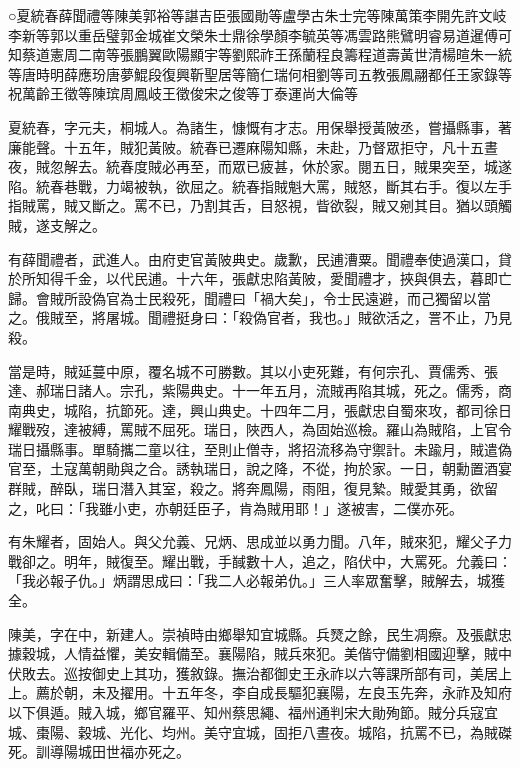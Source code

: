 
\begin{pinyinscope}
○夏統春薛聞禮等陳美郭裕等諶吉臣張國勛等盧學古朱士完等陳萬策李開先許文岐李新等郭以重岳璧郭金城崔文榮朱士鼎徐學顏李毓英等馮雲路熊鷿明睿易道暹傅可知蔡道憲周二南等張鵬翼歐陽顯宇等劉熙祚王孫蘭程良籌程道壽黃世清楊暄朱一統等唐時明薛應玢唐夢鯤段復興靳聖居等簡仁瑞何相劉等司五教張鳳翮都任王家錄等祝萬齡王徵等陳瑸周鳳岐王徵俊宋之俊等丁泰運尚大倫等

夏統春，字元夫，桐城人。為諸生，慷慨有才志。用保舉授黃陂丞，嘗攝縣事，著廉能聲。十五年，賊犯黃陂。統春已遷麻陽知縣，未赴，乃督眾拒守，凡十五晝夜，賊忽解去。統春度賊必再至，而眾已疲甚，休於家。閱五日，賊果突至，城遂陷。統春巷戰，力竭被執，欲屈之。統春指賊魁大罵，賊怒，斷其右手。復以左手指賊罵，賊又斷之。罵不已，乃割其舌，目怒視，眥欲裂，賊又剜其目。猶以頭觸賊，遂支解之。

有薛聞禮者，武進人。由府吏官黃陂典史。歲歉，民逋漕粟。聞禮奉使過漢口，貸於所知得千金，以代民逋。十六年，張獻忠陷黃陂，愛聞禮才，挾與俱去，暮即亡歸。會賊所設偽官為士民殺死，聞禮曰「禍大矣」，令士民遠避，而己獨留以當之。俄賊至，將屠城。聞禮挺身曰：「殺偽官者，我也。」賊欲活之，詈不止，乃見殺。

當是時，賊延蔓中原，覆名城不可勝數。其以小吏死難，有何宗孔、賈儒秀、張達、郝瑞日諸人。宗孔，紫陽典史。十一年五月，流賊再陷其城，死之。儒秀，商南典史，城陷，抗節死。達，興山典史。十四年二月，張獻忠自蜀來攻，都司徐日耀戰歿，達被縛，罵賊不屈死。瑞日，陜西人，為固始巡檢。羅山為賊陷，上官令瑞日攝縣事。單騎攜二童以往，至則止僧寺，將招流移為守禦計。未踰月，賊遣偽官至，土寇萬朝勛與之合。誘執瑞日，說之降，不從，拘於家。一日，朝勳置酒宴群賊，醉臥，瑞日潛入其室，殺之。將奔鳳陽，雨阻，復見縶。賊愛其勇，欲留之，叱曰：「我雖小吏，亦朝廷臣子，肯為賊用耶！」遂被害，二僕亦死。

有朱耀者，固始人。與父允義、兄炳、思成並以勇力聞。八年，賊來犯，耀父子力戰卻之。明年，賊復至。耀出戰，手馘數十人，追之，陷伏中，大罵死。允義曰：「我必報子仇。」炳謂思成曰：「我二人必報弟仇。」三人率眾奮擊，賊解去，城獲全。

陳美，字在中，新建人。崇禎時由鄉舉知宜城縣。兵燹之餘，民生凋瘵。及張獻忠據穀城，人情益懼，美安輯備至。襄陽陷，賊兵來犯。美偕守備劉相國迎擊，賊中伏敗去。巡按御史上其功，獲敘錄。撫治都御史王永祚以六等課所部有司，美居上上。薦於朝，未及擢用。十五年冬，李自成長驅犯襄陽，左良玉先奔，永祚及知府以下俱遁。賊入城，鄉官羅平、知州蔡思繩、福州通判宋大勛殉節。賊分兵寇宜城、棗陽、穀城、光化、均州。美守宜城，固拒八晝夜。城陷，抗罵不已，為賊磔死。訓導陽城田世福亦死之。


\end{pinyinscope}

